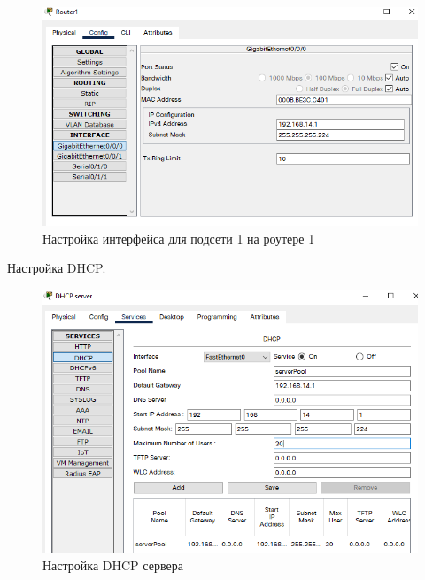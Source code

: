 \documentclass[12pt, a4paper]{extarticle}
\begin{document}
\begin{figure}[H]
	\centering
	\includegraphics[scale=0.9]{images/router1.png}
	\caption{Настройка интерфейса для подсети 1 на роутере 1}
\end{figure}

Настройка DHCP.
\begin{figure}[H]
	\centering
	\includegraphics[scale=0.9]{images/dhcp.png}
	\caption{Настройка DHCP сервера}
\end{figure}
\end{document}
